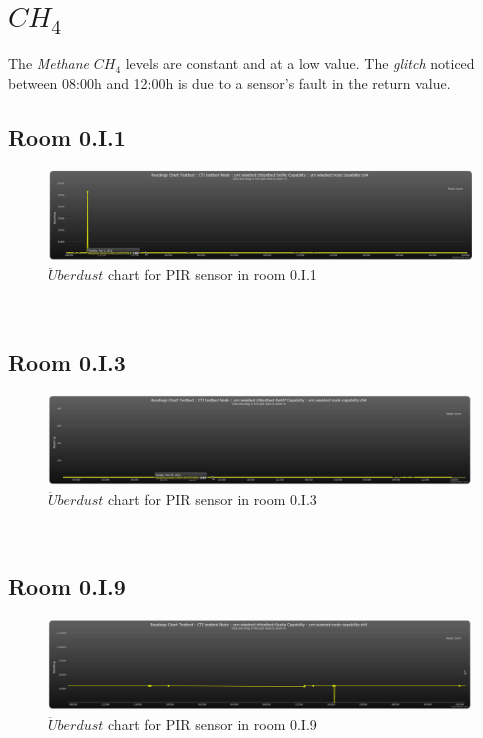 \documentclass[12pt,a4paper]{report}
\begin{document}
\section{$CH_4$}
%
The \textit{Methane} $CH_4$ levels are constant and at a low value.
The \textit{glitch} noticed between 08:00h and 12:00h is due to a sensor's fault in the return value.
\subsection{Room 0.I.1}
%
\begin{figure}[H]
\centering
	\includegraphics*[width=\textwidth]{ch4_1}
	\caption{$\ddot{U}berdust$ chart for PIR sensor in room 0.I.1}
	\label{chart_ch4_1}
\end{figure}
\ \\
%
\subsection{Room 0.I.3}
%
\begin{figure}[H]
\centering
	\includegraphics*[width=\textwidth]{ch4_3}
	\caption{$\ddot{U}berdust$ chart for PIR sensor in room 0.I.3}
	\label{chart_ch4_3}
\end{figure}
\ \\
%
\subsection{Room 0.I.9}
%
\begin{figure}[H]
\centering
	\includegraphics*[width=\textwidth]{ch4_9}
	\caption{$\ddot{U}berdust$ chart for PIR sensor in room 0.I.9}
	\label{chart_ch4_9}
\end{figure}
\ \\
%
\end{document}
